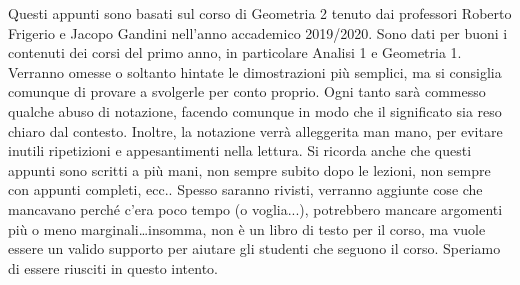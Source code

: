 Questi appunti sono basati sul corso di Geometria 2 tenuto dai professori
Roberto Frigerio e Jacopo Gandini nell'anno accademico 2019/2020. Sono dati per
buoni i contenuti dei corsi del primo anno, in particolare Analisi 1 e Geometria
1. Verranno omesse o soltanto hintate le dimostrazioni più semplici, ma si
consiglia comunque di provare a svolgerle per conto proprio. Ogni tanto sarà
commesso qualche abuso di notazione, facendo comunque in modo che il significato
sia reso chiaro dal contesto. Inoltre, la notazione verrà alleggerita man mano,
per evitare inutili ripetizioni e appesantimenti nella lettura. Si ricorda anche
che questi appunti sono scritti a più mani, non sempre subito dopo le lezioni,
non sempre con appunti completi, ecc.. Spesso saranno rivisti, verranno aggiunte
cose che mancavano perché c'era poco tempo (o voglia...), potrebbero mancare
argomenti più o meno marginali\dots insomma, non è un libro di testo per il
corso, ma vuole essere un valido supporto per aiutare gli studenti che seguono
il corso. Speriamo di essere riusciti in questo intento.
